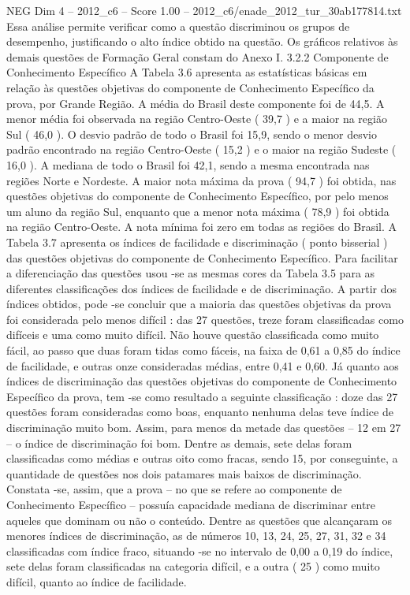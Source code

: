 \begin{textsample}{NEG Dim 4 – 2012\_c6 – Score 1.00 – 2012\_c6/enade\_2012\_tur\_30ab177814.txt}
Essa análise permite verificar como a questão discriminou os grupos de desempenho, justificando o alto índice obtido na questão.
Os gráficos relativos às demais questões de Formação Geral constam do Anexo I. 3.2.2 Componente de Conhecimento Específico A Tabela 3.6 apresenta as estatísticas básicas em relação às questões objetivas do componente de Conhecimento Específico da prova, por Grande Região.
A média do Brasil deste componente foi de 44,5.
A menor média foi observada na região Centro-Oeste ( 39,7 ) e a maior na região Sul ( 46,0 ).
O desvio padrão de todo o Brasil foi 15,9, sendo o menor desvio padrão encontrado na região Centro-Oeste ( 15,2 ) e o maior na região Sudeste ( 16,0 ).
A mediana de todo o Brasil foi 42,1, sendo a mesma encontrada nas regiões Norte e Nordeste.
A maior nota máxima da prova ( 94,7 ) foi obtida, nas questões objetivas do componente de Conhecimento Específico, por pelo menos um aluno da região Sul, enquanto que a menor nota máxima ( 78,9 ) foi obtida na região Centro-Oeste.
A nota mínima foi zero em todas as regiões do Brasil.
A Tabela 3.7 apresenta os índices de facilidade e discriminação ( ponto bisserial ) das questões objetivas do componente de Conhecimento Específico.
Para facilitar a diferenciação das questões usou -se as mesmas cores da Tabela 3.5 para as diferentes classificações dos índices de facilidade e de discriminação.
A partir dos índices obtidos, pode -se concluir que a maioria das questões objetivas da prova foi considerada pelo menos difícil : das 27 questões, treze foram classificadas como difíceis e uma como muito difícil.
Não houve questão classificada como muito fácil, ao passo que duas foram tidas como fáceis, na faixa de 0,61 a 0,85 do índice de facilidade, e outras onze consideradas médias, entre 0,41 e 0,60.
Já quanto aos índices de discriminação das questões objetivas do componente de Conhecimento Específico da prova, tem -se como resultado a seguinte classificação : doze das 27 questões foram consideradas como boas, enquanto nenhuma delas teve índice de discriminação muito bom.
Assim, para menos da metade das questões – 12 em 27 – o índice de discriminação foi bom.
Dentre as demais, sete delas foram classificadas como médias e outras oito como fracas, sendo 15, por conseguinte, a quantidade de questões nos dois patamares mais baixos de discriminação.
Constata -se, assim, que a prova – no que se refere ao componente de Conhecimento Específico – possuía capacidade mediana de discriminar entre aqueles que dominam ou não o conteúdo.
Dentre as questões que alcançaram os menores índices de discriminação, as de números 10, 13, 24, 25, 27, 31, 32 e 34 classificadas com índice fraco, situando -se no intervalo de 0,00 a 0,19 do índice, sete delas foram classificadas na categoria difícil, e a outra ( 25 ) como muito difícil, quanto ao índice de facilidade.

\end{textsample}
